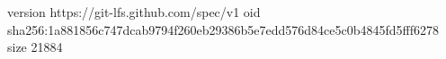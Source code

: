 version https://git-lfs.github.com/spec/v1
oid sha256:1a881856c747dcab9794f260eb29386b5e7edd576d84ce5c0b4845fd5fff6278
size 21884
